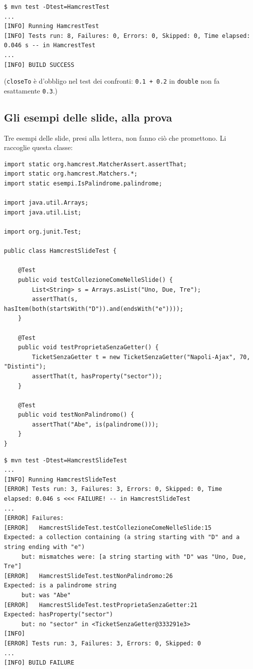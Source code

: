 \begin{lstlisting}[style=shell, name=Terminale]
$ mvn test -Dtest=HamcrestTest
...
[INFO] Running HamcrestTest
[INFO] Tests run: 8, Failures: 0, Errors: 0, Skipped: 0, Time elapsed: 0.046 s -- in HamcrestTest
...
[INFO] BUILD SUCCESS
\end{lstlisting}

(\texttt{closeTo} è d'obbligo nel test dei confronti: \texttt{0.1 + 0.2} in \texttt{double} non fa esattamente
\texttt{0.3}.)

\subsection{Gli esempi delle slide, alla prova}

Tre esempi delle slide, presi alla lettera, non fanno ciò che promettono. Li raccoglie questa classe:

\begin{lstlisting}[style=java, name=HamcrestSlideTest.java]
import static org.hamcrest.MatcherAssert.assertThat;
import static org.hamcrest.Matchers.*;
import static esempi.IsPalindrome.palindrome;

import java.util.Arrays;
import java.util.List;

import org.junit.Test;

public class HamcrestSlideTest {

    @Test
    public void testCollezioneComeNelleSlide() {
        List<String> s = Arrays.asList("Uno, Due, Tre");
        assertThat(s, hasItem(both(startsWith("D")).and(endsWith("e"))));
    }

    @Test
    public void testProprietaSenzaGetter() {
        TicketSenzaGetter t = new TicketSenzaGetter("Napoli-Ajax", 70, "Distinti");
        assertThat(t, hasProperty("sector"));
    }

    @Test
    public void testNonPalindromo() {
        assertThat("Abe", is(palindrome()));
    }
}
\end{lstlisting}

\begin{lstlisting}[style=shell, name=Terminale]
$ mvn test -Dtest=HamcrestSlideTest
...
[INFO] Running HamcrestSlideTest
[ERROR] Tests run: 3, Failures: 3, Errors: 0, Skipped: 0, Time elapsed: 0.046 s <<< FAILURE! -- in HamcrestSlideTest
...
[ERROR] Failures:
[ERROR]   HamcrestSlideTest.testCollezioneComeNelleSlide:15
Expected: a collection containing (a string starting with "D" and a string ending with "e")
     but: mismatches were: [a string starting with "D" was "Uno, Due, Tre"]
[ERROR]   HamcrestSlideTest.testNonPalindromo:26
Expected: is a palindrome string
     but: was "Abe"
[ERROR]   HamcrestSlideTest.testProprietaSenzaGetter:21
Expected: hasProperty("sector")
     but: no "sector" in <TicketSenzaGetter@333291e3>
[INFO]
[ERROR] Tests run: 3, Failures: 3, Errors: 0, Skipped: 0
...
[INFO] BUILD FAILURE
\end{lstlisting}

